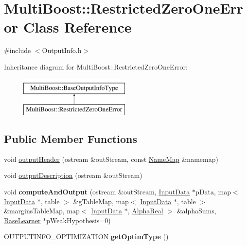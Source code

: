 \hypertarget{classMultiBoost_1_1RestrictedZeroOneError}{\section{Multi\-Boost\-:\-:Restricted\-Zero\-One\-Error Class Reference}
\label{classMultiBoost_1_1RestrictedZeroOneError}
}


{\ttfamily \#include $<$Output\-Info.\-h$>$}

Inheritance diagram for Multi\-Boost\-:\-:Restricted\-Zero\-One\-Error\-:\begin{figure}[H]
\begin{center}
\leavevmode
\includegraphics[height=2.000000cm]{classMultiBoost_1_1RestrictedZeroOneError}
\end{center}
\end{figure}
\subsection*{Public Member Functions}
\begin{DoxyCompactItemize}
\item 
void \hyperlink{classMultiBoost_1_1RestrictedZeroOneError_a5b9ed19e09af40702ca62c79477cfc96}{output\-Header} (ostream \&out\-Stream, const \hyperlink{classMultiBoost_1_1NameMap}{Name\-Map} \&namemap)
\item 
void \hyperlink{classMultiBoost_1_1RestrictedZeroOneError_a6ed82c03ced104c414a8994b869f5693}{output\-Description} (ostream \&out\-Stream)
\item 
\hypertarget{classMultiBoost_1_1RestrictedZeroOneError_acc4016532e2dce3f6a943eb3e312adad}{void {\bfseries compute\-And\-Output} (ostream \&out\-Stream, \hyperlink{classMultiBoost_1_1InputData}{Input\-Data} $\ast$p\-Data, map$<$ \hyperlink{classMultiBoost_1_1InputData}{Input\-Data} $\ast$, table $>$ \&g\-Table\-Map, map$<$ \hyperlink{classMultiBoost_1_1InputData}{Input\-Data} $\ast$, table $>$ \&margins\-Table\-Map, map$<$ \hyperlink{classMultiBoost_1_1InputData}{Input\-Data} $\ast$, \hyperlink{Defaults_8h_a80184c4fd10ab70a1a17c5f97dcd1563}{Alpha\-Real} $>$ \&alpha\-Sums, \hyperlink{classMultiBoost_1_1BaseLearner}{Base\-Learner} $\ast$p\-Weak\-Hypothesis=0)}\label{classMultiBoost_1_1RestrictedZeroOneError_acc4016532e2dce3f6a943eb3e312adad}

\item 
\hypertarget{classMultiBoost_1_1RestrictedZeroOneError_a59f70da96a8f57d6c163fa8ba937b407}{O\-U\-T\-P\-U\-T\-I\-N\-F\-O\-\_\-\-O\-P\-T\-I\-M\-I\-Z\-A\-T\-I\-O\-N {\bfseries get\-Optim\-Type} ()}\label{classMultiBoost_1_1RestrictedZeroOneError_a59f70da96a8f57d6c163fa8ba937b407}

\end{DoxyCompactItemize}
